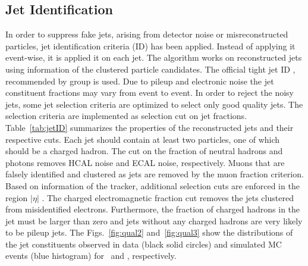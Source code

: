 \subsection{Jet Identification}
In order to suppress fake jets, arising from detector noise or misreconstructed particles, jet identification criteria (ID) has been applied. Instead of applying it event-wise, it is applied it on each jet. The algorithm works on reconstructed jets using information of the clustered particle candidates. The official tight jet ID \cite{CMS:2010xta}, recommended by \JetMet group \cite{JetID} is used. Due to pileup and electronic noise the jet constituent fractions may vary from event to event. In order to reject the noisy jets, some jet selection criteria are optimized to select only good quality jets. The selection criteria are implemented as selection cut on jet fractions. Table~\ref{tab:jetID} summarizes the properties of the reconstructed jets and their respective cuts. Each jet should contain at least two particles, one of which should be a charged hadron. The cut on the fraction of neutral hadrons and photons removes HCAL noise and ECAL noise, respectively. Muons that are falsely identified and clustered as jets are removed by the muon fraction criterion. Based on information of the tracker, additional selection cuts are enforced in the region $|\eta|$ . The charged electromagnetic fraction cut removes the jets clustered from misidentified electrons. Furthermore, the fraction of charged hadrons in the jet must be larger than zero and jets without any charged hadrons are very likely to be pileup jets. The Figs.~\ref{fig:qual2} and~\ref{fig:qual3} show the distributions of the jet constituents observed in data (black solid circles) and simulated MC events (blue histogram) for \njt~and \njth, respectively.

